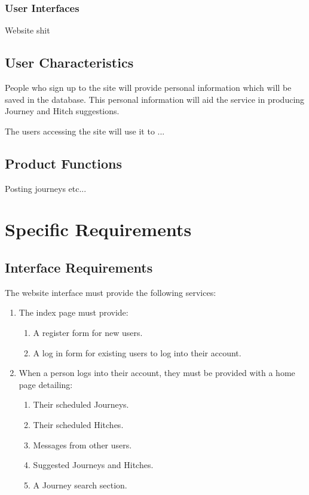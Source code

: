 \documentclass[11pt]{article}
\begin{document}
\subsubsection{User Interfaces}
Website shit
\subsection{User Characteristics}
People who sign up to the site will provide personal information which will be saved in the database. This personal information will aid the service in producing Journey and Hitch suggestions. 

The users accessing the site will use it to ...
\subsection{Product Functions}

Posting journeys etc...

\section{Specific Requirements}
\subsection{Interface Requirements}
The website interface must provide the following services:
\begin{enumerate}

\item The index page must provide:
\begin{enumerate}
\item A register form for new users.
\item A log in form for existing users to log into their account.
\end{enumerate}

\item When a person logs into their account, they must be provided with a home page detailing:
\begin{enumerate}
\item Their scheduled Journeys.
\item Their scheduled Hitches.
\item Messages from other users.
\item Suggested Journeys and Hitches.
\item A Journey search section.
\end{enumerate}
\end{enumerate}
\end{document}
